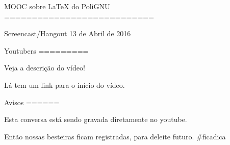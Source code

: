 MOOC sobre LaTeX do PoliGNU
===========================

Screencast/Hangout  13 de Abril de 2016


Youtubers
=========

Veja a descrição do vídeo!

Lá tem um link para o início do vídeo.


Avisos
======

Esta conversa está sendo gravada
diretamente no youtube.

Então nossas besteiras ficam registradas,
para deleite futuro. #ficadica

